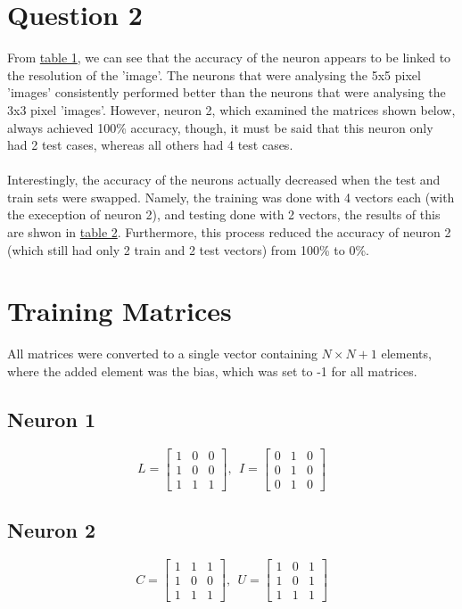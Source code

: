 \documentclass{article}
\begin{document}
\section{Question 2}
From \hyperref[T1]{table 1}, we can see that the accuracy of the neuron appears to be linked to the resolution of the 'image'. The neurons that were analysing the 5x5 pixel 'images' consistently performed better than the neurons that were analysing the 3x3 pixel 'images'. However, neuron 2, which examined the matrices shown below, always achieved 100\% accuracy, though, it must be said that this neuron only had 2 test cases, whereas all others had 4 test cases.\\ \\Interestingly, the accuracy of the neurons actually decreased when the test and train sets were swapped. Namely, the training was done with 4 vectors each (with the exeception of neuron 2), and testing done with 2 vectors, the results of this are shwon in \hyperref[T2]{table 2}. Furthermore, this process reduced the accuracy of neuron 2 (which still had only 2 train and 2 test vectors) from 100\% to 0\%. 

\section{Training Matrices}
	All matrices were converted to a single vector containing $N\times N + 1$ elements, where the added element was the bias, which was set to -1 for all matrices.
	\subsection{Neuron 1}
	\[
	L = 
	\begin{bmatrix}
	1 & 0 & 0 \\
	1 & 0 & 0 \\
	1 & 1 & 1
	\end{bmatrix}
	,~~I = 
	\begin{bmatrix}
	0 & 1 & 0 \\
	0 & 1 & 0 \\
	0 & 1 & 0
	\end{bmatrix}
	\]
	\subsection{Neuron 2}
	\[
	C = 
	\begin{bmatrix}
	1 & 1 & 1 \\
	1 & 0 & 0 \\
	1 & 1 & 1
	\end{bmatrix}
	,~~U = 
	\begin{bmatrix}
	1 & 0 & 1 \\
	1 & 0 & 1 \\
	1 & 1 & 1
	\end{bmatrix}
	\]
\end{document}
